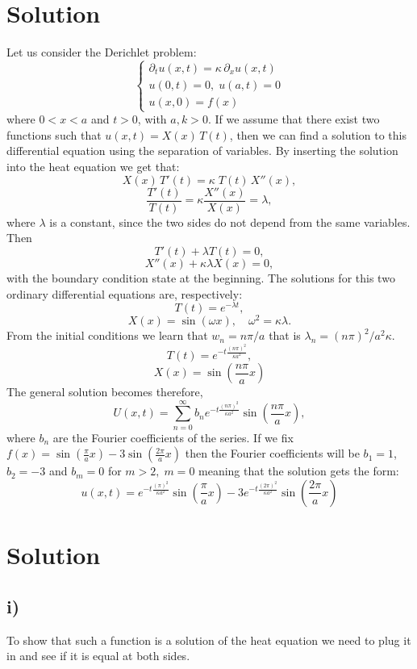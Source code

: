 \documentclass{article}[a4paper]
\begin{document}
\section{Solution} %
Let us consider the Derichlet problem:
\[
    \begin{cases}
        \partial_t u(x,t) = \kappa\, \partial_x u(x,t)\\
        u(0,t) = 0,\; u(a,t) = 0\\
        u(x, 0) = f(x)
    \end{cases}
\]
where $0<x<a$ and $t>0$, with $a, k >0$. If we assume that there exist two functions such that $u(x,t) = X(x)\, T(t)$, then we can find a solution to this differential equation using the separation of variables. By inserting the solution into the heat equation we get that:
\[
    X(x)\,T'(t) = \kappa\; T(t)\, X''(x),
\]
\[
    \frac{T'(t)}{T(t)} = \kappa \frac{X''(x)}{X(x)} = \lambda,
\]
where $\lambda$ is a constant, since the two sides do not depend from the same variables. Then
\[
    T'(t) + \lambda T(t) = 0,
\]
\[
    X''(x) + \kappa \lambda X(x) = 0,
\]
with the boundary condition state at the beginning. The solutions for this two ordinary differential equations are, respectively:
\[
    T(t) = e^{-\lambda t},
\]
\[
    X(x) = \sin{(\omega x)}, \quad \omega^2 = \kappa \lambda.
\]
From the initial conditions we learn that $w_n = n \pi / a$ that is $\lambda_n = ( n \pi)^2 / a^2 \kappa$.
\[
    T(t) = e^{- t\frac{(n \pi)^2}{\kappa a^2} },
\]
\[
    X(x) = \sin{\left(\frac{n \pi}{a} x \right)}
\]
The general solution becomes therefore,
\[
    U(x,t) = \sum_{n=0}^{\infty} b_n e^{- t\frac{(n \pi)^2}{\kappa a^2}}\sin{\left(\frac{n \pi}{a} x \right)},
\]
where $b_n$ are the Fourier coefficients of the series.
If we fix $f(x) = \sin{\left(\frac{\pi}{a} x \right)} - 3\sin{\left(\frac{2 \pi}{a} x \right)}$ then the Fourier coefficients will be $b_1 = 1$, $b_2 = -3$ and $b_m =0$ for $m>2, \; m=0$ meaning that the solution gets the form:
\[
    u(x,t) = e^{- t\frac{(\pi)^2}{\kappa a^2}}\sin{\left(\frac{\pi}{a} x \right)} - 3e^{- t\frac{(2 \pi)^2}{\kappa a^2}}\sin{\left(\frac{2 \pi}{a} x \right)}
\]

\section{Solution}
\subsection*{i)}
To show that such a function is a solution of the heat equation we need to plug it in and see if it is equal at both sides.
\end{document}
